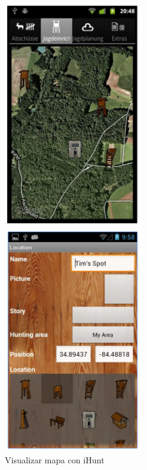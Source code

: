 \begin{figure}[htbp]
\begin{minipage}[b]{0.5\linewidth} %
\centering
\includegraphics[width=6cm]{iHunt1.png}
\caption{ Visualizar mapa con iHunt}
\label{fig:iHunt1}
\end{minipage}
\hspace{0.5cm} %
\begin{minipage}[b]{0.5\linewidth}
\centering
\includegraphics[width=6cm]{iHunt2.png}


\end{minipage}
\end{figure}
